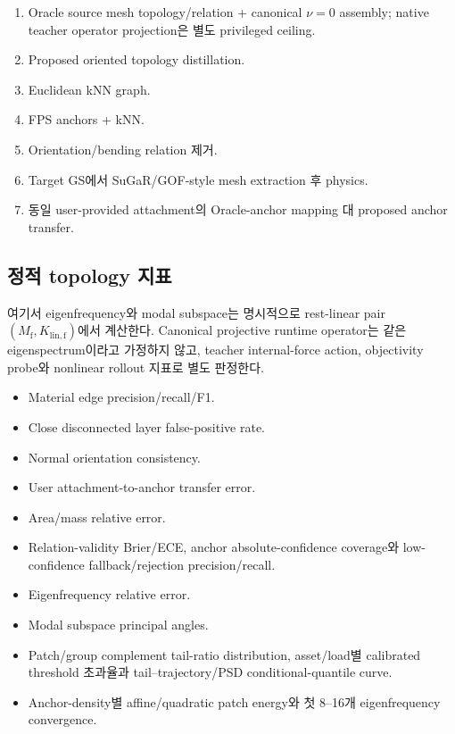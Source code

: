 \documentclass[11pt,a4paper]{article}
\begin{document}
\begin{enumerate}[leftmargin=1.7em]
  \item Oracle source mesh topology/relation + canonical \(\nu=0\) assembly;
  native teacher operator projection은 별도 privileged ceiling.
  \item Proposed oriented topology distillation.
  \item Euclidean kNN graph.
  \item FPS anchors + kNN.
  \item Orientation/bending relation 제거.
  \item Target GS에서 SuGaR/GOF-style mesh extraction 후 physics.
  \item 동일 user-provided attachment의 Oracle-anchor mapping 대 proposed anchor transfer.
\end{enumerate}

\subsection*{정적 topology 지표}

여기서 eigenfrequency와 modal subspace는 명시적으로
rest-linear pair \((M_{\mathrm f},K_{\mathrm{lin,f}})\)에서 계산한다.
Canonical projective runtime operator는 같은 eigenspectrum이라고 가정하지 않고,
teacher internal-force action, objectivity probe와 nonlinear rollout 지표로 별도 판정한다.

\begin{itemize}[leftmargin=1.5em]
  \item Material edge precision/recall/F1.
  \item Close disconnected layer false-positive rate.
  \item Normal orientation consistency.
  \item User attachment-to-anchor transfer error.
  \item Area/mass relative error.
  \item Relation-validity Brier/ECE, anchor absolute-confidence coverage와
  low-confidence fallback/rejection precision/recall.
  \item Eigenfrequency relative error.
  \item Modal subspace principal angles.
  \item Patch/group complement tail-ratio distribution,
  asset/load별 calibrated threshold 초과율과 tail--trajectory/PSD conditional-quantile curve.
  \item Anchor-density별 affine/quadratic patch energy와 첫 8--16개 eigenfrequency convergence.
\end{itemize}
\end{document}
